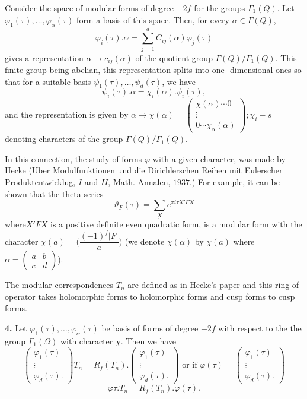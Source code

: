 Consider the space of modular forms of degree $-2f$ for the groups
$\Gamma_1(Q)$. Let $\varphi_1(\tau), \ldots, \varphi_\alpha
(\tau)$ form a basis of this space. Then, for every $\alpha \in \Gamma
(Q)$, 
$$
\varphi_i (\tau).\alpha =\sum^d_{j=1}C_{ij}(\alpha)\varphi_j(\tau)
$$
gives a representation $\alpha \to c_{ij}(\alpha)$ of the quotient
group $\Gamma(Q)/ \Gamma_1(Q)$. This finite group being
abelian, this representation splits into one- dimensional ones so that
for a suitable basis $\psi_1 (\tau),\ldots, \psi_d (\tau)$, we
have  
$$
\psi_i(\tau).\alpha =\chi_i(\alpha).\psi_i(\tau),
$$
and the representation is given by $\alpha \to \chi
(\alpha)=\begin{pmatrix}\chi (\alpha)\cdots 0\\ \vdots\\ 0 \cdots
  \chi_\alpha (\alpha) \end{pmatrix}; \chi_i-s$ denoting characters of
the group $\Gamma (Q)/\Gamma_1(Q)$. 

In this connection, the study of forms $\varphi$ with a given
character, was made by Hecke (Uber Modulfunktionen und die
Dirichlerschen Reihen mit Eulerscher Produktentwicklug, $I$ and $II$,
Math. Annalen, $1937$.) For example, it can be shown that the
theta-series 
$$
\vartheta_F (\tau) = \sum_{\underbar{X}}e^{\pi i \tau \underbar{X}' F
  \underbar{X}} 
$$
where\pageoriginale $\underbar{X}' F\underbar{X}$ is a positive definite even
quadratic form, is a modular form with the character $\chi(a)=\bigg(
\dfrac{(-1)^f|F|}{a}\bigg)$ (we denote $\chi (\alpha)$ by $\chi (a)$
where $\alpha= \begin{pmatrix}a&b\\c&d \end{pmatrix}$). 

The modular correspondences $T_n$ are defined as in Hecke's paper and
this ring of operator takes holomorphic forms to holomorphic forms and
cusp forms to cusp forms. 

\textbf{4.} Let $\varphi_1(\tau),\ldots,\varphi_\alpha (\tau)$ be basis of
forms of degree $-2f$ with respect to the the group $\Gamma_1(\Omega)$
with character $\chi$. Then we have 
$$
\begin{pmatrix}
  \varphi_1 (\tau)\\ \vdots\\ \varphi_d (\tau).
\end{pmatrix}
T_n=R_f(T_n).
\begin{pmatrix}
  \varphi_1 (\tau)\\ \vdots\\ \varphi_d (\tau).
\end{pmatrix}
\text{ or if } \varphi(\tau)=
\begin{pmatrix}
  \varphi_1 (\tau)\\ \vdots\\ \varphi_d (\tau).
\end{pmatrix}
$$
$$
\varphi{\tau}.T_n=R_f(T_n).\varphi (\tau).
$$


